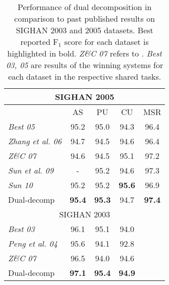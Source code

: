 \begin{table}[h]
\centering
\begin{footnotesize}
\begin{tabular}{ l | c | c | c | c   }
\multicolumn{5}{c}{{SIGHAN 2005}} \\
\hline
                                &   AS     &  PU  & CU  & MSR  \\
\textit{Best 05}               & 95.2   &  95.0 & 94.3 & 96.4 \\
\textit{Zhang et al. 06}  & 94.7  & 94.5 & 94.6 & 96.4 \\
\textit{Z\&C 07}              & 94.6   &  94.5 & 95.1 & 97.2 \\
\textit{Sun et al. 09}      & -         &  95.2 & 94.6 & 97.3 \\
\textit{Sun 10}                & 95.2   &  95.2 & \textbf{95.6} &  96.9 \\
Dual-decomp                       & \textbf{95.4}  & \textbf{95.3} & 94.7 & \textbf{97.4} \\
\hline
\multicolumn{5}{c}{{SIGHAN 2003}} \\
\hline
\textit{Best 03}            &  96.1   & 95.1 &  \multicolumn{1}{c}{94.0} &  \\
\textit{Peng et al. 04}  & 95.6   &  94.1 &  \multicolumn{1}{c}{92.8} & \\
\textit{Z\&C 07}             & 96.5  &  94.0 &  \multicolumn{1}{c}{94.6} & \\
Dual-decomp                     & \textbf{97.1} & \textbf{95.4} &  \multicolumn{1}{c}{\textbf{94.9}} &\\
\end{tabular} 
\caption{Performance of dual decomposition in comparison to past published results on SIGHAN 2003 and 2005 datasets.  Best reported F$_{1}$ score for each dataset is highlighted in bold. \textit{Z\&C 07} refers to . \textit{Best 03, 05} are results of the winning systems for each dataset in the respective shared tasks.}\label{tbl:comparison}
\end{footnotesize}
\end{table}
%

